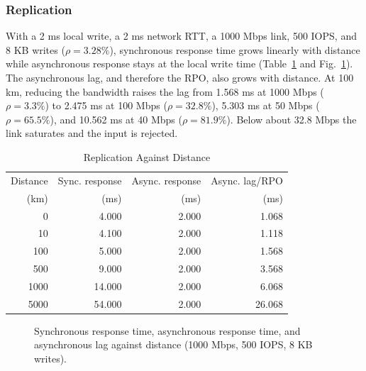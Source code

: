 \documentclass{ieeeaccess}
\begin{document}
\subsubsection{Replication}
With a 2 ms local write, a 2 ms network RTT, a 1000 Mbps link, 500 IOPS, and 8 KB writes ($\rho = 3.28\%$), synchronous response time grows linearly with distance while asynchronous response stays at the local write time (Table~\ref{tab:repl} and Fig.~\ref{fig:repl}). The asynchronous lag, and therefore the RPO, also grows with distance. At 100 km, reducing the bandwidth raises the lag from 1.568 ms at 1000 Mbps ($\rho = 3.3\%$) to 2.475 ms at 100 Mbps ($\rho = 32.8\%$), 5.303 ms at 50 Mbps ($\rho = 65.5\%$), and 10.562 ms at 40 Mbps ($\rho = 81.9\%$). Below about 32.8 Mbps the link saturates and the input is rejected.

\begin{table}[!t]
\caption{Replication Against Distance}
\label{tab:repl}
\centering
\footnotesize
\begin{tabular}{rrrr}
\toprule
Distance & Sync. response & Async. response & Async. lag/RPO \\
(km) & (ms) & (ms) & (ms) \\
\midrule
0 & 4.000 & 2.000 & 1.068 \\
10 & 4.100 & 2.000 & 1.118 \\
100 & 5.000 & 2.000 & 1.568 \\
500 & 9.000 & 2.000 & 3.568 \\
1000 & 14.000 & 2.000 & 6.068 \\
5000 & 54.000 & 2.000 & 26.068 \\
\bottomrule
\end{tabular}
\end{table}

\begin{figure}[!t]
\centering
{}
\caption{Synchronous response time, asynchronous response time, and asynchronous lag against distance (1000 Mbps, 500 IOPS, 8 KB writes).}
\label{fig:repl}
\end{figure}
\end{document}
